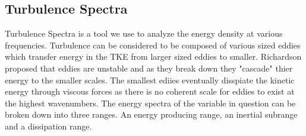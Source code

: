 \documentclass[]{article}
\begin{document}
\subsection{Turbulence Spectra}
Turbulence Spectra is a tool we use to analyze the energy density at various frequencies. Turbulence can be considered to be composed of various sized eddies which transfer energy in the TKE from larger sized eddies to smaller. Richardson proposed that eddies are unstable and as they break down they "cascade" thier energy to the smaller scales. The smallest ediies eventually disspiate the kinetic energy through viscous forces as there is no coherent scale for eddies to exist at the highest wavenumbers.\cite{Pope} The energy spectra of the variable in question can be broken down into three ranges. An energy producing range, an inertial subrange and a dissipation range. 
\end{document}

